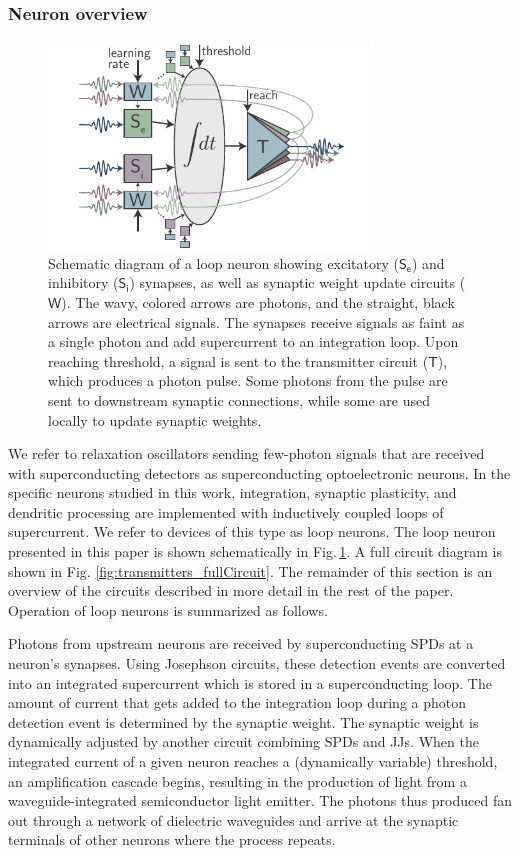 \documentclass[aip,amsmath,amssymb,reprint,nofootinbib]{revtex4-1}
\begin{document}
\subsubsection{\label{sec:neuronOverview}Neuron overview}
\begin{figure}[t!]
	\centerline{\includegraphics[width=8.6cm]{_general_schematic_small.pdf}}
	\caption{\label{fig:general_schematic}Schematic diagram of a loop neuron showing excitatory ($\mathsf{S_e}$) and inhibitory ($\mathsf{S_i}$) synapses, as well as synaptic weight update circuits ($\mathsf{W}$). The wavy, colored arrows are photons, and the straight, black arrows are electrical signals. The synapses receive signals as faint as a single photon and add supercurrent to an integration loop. Upon reaching threshold, a signal is sent to the transmitter circuit ($\mathsf{T}$), which produces a photon pulse. Some photons from the pulse are sent to downstream synaptic connections, while some are used locally to update synaptic weights.}
\end{figure}
We refer to relaxation oscillators sending few-photon signals that are received with superconducting detectors as superconducting optoelectronic neurons. In the specific neurons studied in this work, integration, synaptic plasticity, and dendritic processing are implemented with inductively coupled loops of supercurrent. We refer to devices of this type as loop neurons. The loop neuron presented in this paper is shown schematically in Fig.\,\ref{fig:general_schematic}. A full circuit diagram is shown in Fig. \ref{fig:transmitters_fullCircuit}. The remainder of this section is an overview of the circuits described in more detail in the rest of the paper. Operation of loop neurons is summarized as follows. 

Photons from upstream neurons are received by superconducting SPDs at a neuron's synapses. Using Josephson circuits, these detection events are converted into an integrated supercurrent which is stored in a superconducting loop. The amount of current that gets added to the integration loop during a photon detection event is determined by the synaptic weight. The synaptic weight is dynamically adjusted by another circuit combining SPDs and JJs. When the integrated current of a given neuron reaches a (dynamically variable) threshold, an amplification cascade begins, resulting in the production of light from a waveguide-integrated semiconductor light emitter. The photons thus produced fan out through a network of dielectric waveguides and arrive at the synaptic terminals of other neurons where the process repeats.
\end{document}

